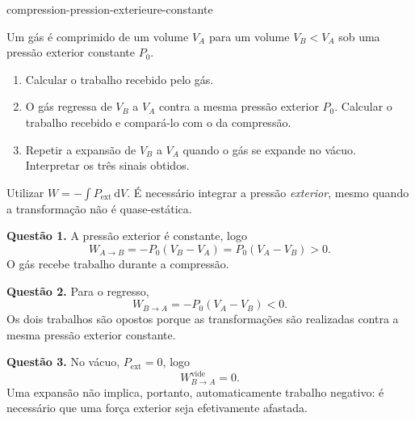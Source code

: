 \begin{exo}{compression-pression-exterieure-constante}

Um gás é comprimido de um volume $V_A$ para um volume $V_B<V_A$ sob uma
pressão exterior constante $P_0$.

\begin{enumerate}
\item Calcular o trabalho recebido pelo gás.
\item O gás regressa de $V_B$ a $V_A$ contra a mesma pressão exterior $P_0$. Calcular o trabalho recebido e compará-lo com o da compressão.
\item Repetir a expansão de $V_B$ a $V_A$ quando o gás se expande no vácuo. Interpretar os três sinais obtidos.
\end{enumerate}

\begin{indication}
Utilizar $W=-\int P_{\mathrm{ext}}\,\mathrm{d}V$. É necessário integrar a
pressão \emph{exterior}, mesmo quando a transformação não é quase-estática.
\end{indication}

\begin{solution}
\textbf{Questão 1.} A pressão exterior é constante, logo
\[W_{A\to B}=-P_0(V_B-V_A)=P_0(V_A-V_B)>0.\]
O gás recebe trabalho durante a compressão.

\textbf{Questão 2.} Para o regresso,
\[W_{B\to A}=-P_0(V_A-V_B)<0.\]
Os dois trabalhos são opostos porque as transformações são realizadas contra
a mesma pressão exterior constante.

\textbf{Questão 3.} No vácuo, $P_{\mathrm{ext}}=0$, logo
\[W_{B\to A}^{\mathrm{vide}}=0.\]
Uma expansão não implica, portanto, automaticamente trabalho negativo: é
necessário que uma força exterior seja efetivamente afastada.
\end{solution}
\end{exo}
